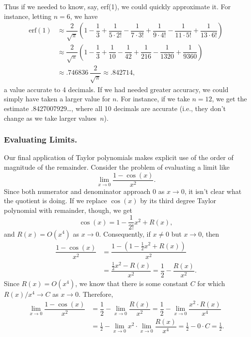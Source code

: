 Thus if we needed to know, say, erf(1), we could quickly approximate
it.  For instance, letting $n=6$, we have
\begin{align*}
\mbox{erf$(1)$}
   &\approx  \dfrac{2}{\sqrt{\pi}} 
        \left(1 - \dfrac{1}{3} + \dfrac{1}{5 \cdot 2!} -
        \dfrac{1}{7 \cdot 3!} + \dfrac{1}{9 \cdot 4!} 
        - \dfrac{1}{11 \cdot 5!} + \dfrac{1}{13 \cdot 6!}\right)\\[3pt]
   &\approx \dfrac{2}{\sqrt{\pi}} \left(1 - \dfrac{1}{3} + 
          \dfrac{1}{10} - \dfrac{1}{42} + \dfrac{1}{216} - 
          \dfrac{1}{1320} + \dfrac{1}{9360}\right) \\[3pt]
   &\approx .746836\,\dfrac{2}{\sqrt{\pi}} \approx .842714,
\end{align*}
a value accurate to 4 decimals.  If we had needed greater accuracy, we
could simply have taken a larger value for $n$.  For instance, if we
take $n=12$, we get the estimate .8427007929\ldots , where all 10
decimals are accurate (i.e., they don't change as we take larger
values~$n$).



\subsubsection{Evaluating Limits.}
Our final application of Taylor polynomials
makes explicit use of the order of magnitude of the remainder.
Consider the problem of evaluating a limit like
        \[
\lim_{x \to 0} \dfrac{1 - \cos(x)}{x^2}.
\]
Since both numerator and denominator approach $0$ as $x \to 0$, it
isn't clear what the quotient is doing.  If we replace $\cos(x)$ by
its third degree Taylor polynomial with remainder, though, we get
        \[
\cos(x) = 1 - \dfrac{1}{2!} x^2 + R(x),
\]
and $R(x) = O(x^4)$ as $x \to 0$.  Consequently, if $x \neq 0$ but $x
\to 0$, then
\begin{align*}
\dfrac{1 - \cos(x)}{x^2} 
  &= \dfrac{1-\left(1 - \tfrac{1}{2}x^2 + R(x)\right)}{x^2}\\[3pt]
  &= \dfrac{\tfrac{1}{2}x^2 - R(x)}{x^2} 
      = \dfrac{1}{2} - \dfrac{R(x)}{x^2}.
\end{align*}
Since $R(x) = O(x^4)$, we know that there is some constant $C$ for
which $R(x)/x^4 \to C$ as $x \to 0$.  Therefore,
\begin{align*}
 \lim_{x \to 0}\dfrac{1 - \cos(x)}{x^2}
   &= \dfrac{1}{2} - \lim_{x \to 0}\dfrac{R(x)}{x^2}
        = \dfrac{1}{2} - \lim_{x \to 0}\dfrac{x^2 \cdot R(x)}{x^4} \\[3pt]
   &= \frac{1}{2} -
        \lim_{x \to 0} x^2 \cdot \lim_{x \to 0}\dfrac{R(x)}{x^4} 
        = \frac{1}{2} -  0 \cdot C 
        = \frac{1}{2}.
\end{align*}

